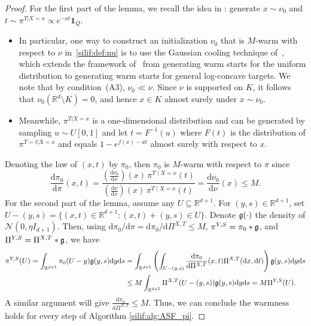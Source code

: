 \documentclass[11pt,letterpaper]{article}
\newcommand{\R}{\mathbb{R}}
\newcommand{\D}{\mathrm{d}}
\newcommand{\brac}[1]{\left( #1\right)}
\newcommand{\red}[1]{\textcolor{red}{#1}}
\begin{document}






\begin{proof}    For the first part of the lemma, we recall the idea in \cite[Theorem 2.15]{kook2025algodiffusion}: generate $x\sim \nu_0$ and $t\sim \pi^{T|X=x}\propto e^{-at}\mathbf{1}_Q$. 
\begin{itemize}
    \item In particular, one way to construct an initialization $\nu_0$ that is $M$-warm with respect to $\nu$ in~\eqref{silif:def:nu} is to use the Gaussian cooling technique of~\cite[Section~3]{kook2025algodiffusion}, which extends the framework of~\cite{cousins2018gaussian} from generating warm starts for the uniform distribution to generating warm starts for general log-concave targets. We note that by condition~(A3), $\nu_0\ll \nu$. Since $\nu$ is supported on $K$, it follows that $\nu_0(\R^d\setminus K)=0$, and hence $x\in K$ almost surely under $x\sim \nu_0$. 
    \item Meanwhile, $\pi^{T|X=x}$ is a one-dimensional distribution and can be generated by sampling $u\sim U[0,1]$ and let $t=F^{-1}(u)$ where $F(t)$ is the distribution of $\pi^{T=t|X=x}$ and equals $1- e^{f(x)-at}$ almost surely with respect to $x$.
\end{itemize}
Denoting the law of $(x,t)$ by $\pi_0$, then $\pi_0$ is $M$-warm with respect to $\pi$ since 
\[
\frac{\D \pi_0}{\D\pi}(x,t)
=\frac{\left(\frac{\D \nu_0}{\D x}\right)(x)\,\pi^{T\mid X=x}(t)}
{\left(\frac{\D \nu}{\D x}\right)(x)\,\pi^{T\mid X=x}(t)}
=\frac{\D\nu_0}{\D\nu}(x)
\le M.\]
    For the second part of the lemma, assume any $U\subseteq \R^{d+1}$. For $(y,s)\in \R^{d+1}$, set $U-(y,s)=\{(x,t)\in \R^{d+1}:(x,t)+(y,s)\in U \}$. Denote $\frak{g}(\cdot)$ the density of $\mathcal{N}(0,\eta I_{d+1})$. Then, using $\D \pi_0/\D \pi=\D \pi_0/\D \Pi^{X,T}\leq M$, $\pi^{Y,S} = \pi_0 * \frak{g}$, and $\Pi^{Y,S} = \Pi^{X,T} * \frak{g}$, we have
\begin{align*}
    \pi^{Y,S}(U)= \int_{\R^{d+1}} \pi_0(U-y) \frak{g}(y,s)\D y\D s&=\int_{\R^{d+1}} \left( \int_{U-(y,s)} \frac{\D \pi_0}{\D \Pi^{X,T}}(x,t)  \Pi^{X,T}(\D x,\D t) \right) \frak{g}(y,s) \D y\D s\\
    &\leq M\int_{\R^{d+1}} \Pi^{X,T}(U-(y,s))\frak{g}(y,s) \D y\D s = M\Pi^{Y,S}(U).
\end{align*}
A similar argument will give $\frac{\D\pi_k}{\D\Pi^{X,T}}\leq M$. Thus, we can conclude the warmness holds for every step of Algorithm \ref{silif:alg:ASF_pi}.
\end{proof}
\end{document}

